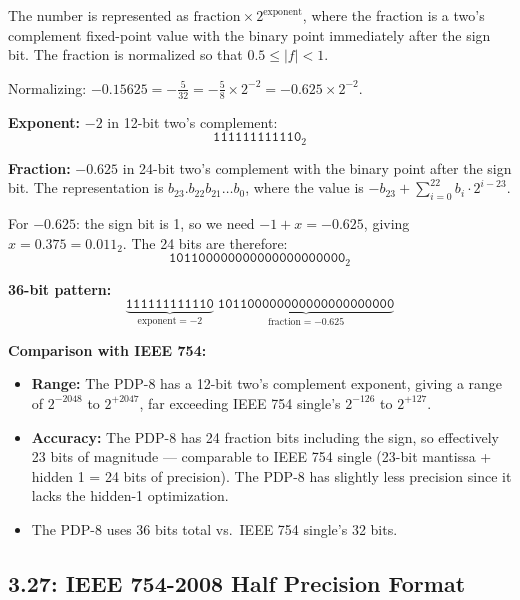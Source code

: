 The number is represented as $\text{fraction} \times 2^{\text{exponent}}$, where the
fraction is a two's complement fixed-point value with the binary point immediately
after the sign bit. The fraction is normalized so that $0.5 \le |f| < 1$.

Normalizing: $-0.15625 = -\tfrac{5}{32} = -\tfrac{5}{8} \times 2^{-2} = -0.625 \times 2^{-2}$.

\noindent\textbf{Exponent:} $-2$ in 12-bit two's complement:
\[
  \texttt{111111111110}_2
\]

\noindent\textbf{Fraction:} $-0.625$ in 24-bit two's complement with the binary point
after the sign bit. The representation is $b_{23}.b_{22}b_{21}\ldots b_0$, where the
value is $-b_{23} + \sum_{i=0}^{22} b_i \cdot 2^{i-23}$.

For $-0.625$: the sign bit is 1, so we need $-1 + x = -0.625$, giving $x = 0.375 = 0.011_2$.
The 24 bits are therefore:
\[
  \texttt{101100000000000000000000}_2
\]

\medskip\noindent\textbf{36-bit pattern:}
\[
  \underbrace{\texttt{111111111110}}_{\text{exponent} = -2}\;
  \underbrace{\texttt{101100000000000000000000}}_{\text{fraction} = -0.625}
\]

\medskip\noindent\textbf{Comparison with IEEE 754:}
\begin{itemize}
  \item \textbf{Range:} The PDP-8 has a 12-bit two's complement exponent, giving
        a range of $2^{-2048}$ to $2^{+2047}$, far exceeding IEEE 754 single's
        $2^{-126}$ to $2^{+127}$.
  \item \textbf{Accuracy:} The PDP-8 has 24 fraction bits including the sign, so
        effectively 23 bits of magnitude --- comparable to IEEE 754 single (23-bit
        mantissa + hidden 1 = 24 bits of precision). The PDP-8 has slightly less
        precision since it lacks the hidden-1 optimization.
  \item The PDP-8 uses 36 bits total vs.\ IEEE 754 single's 32 bits.
\end{itemize}

\subsection*{3.27: IEEE 754-2008 Half Precision Format}
\hypertarget{sol-3.27}{}


